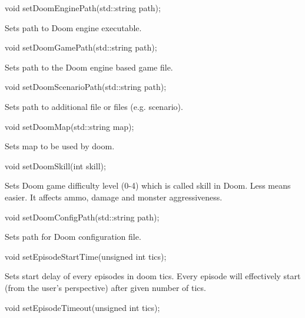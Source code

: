 \vspace{20pt}
\begin{clinee}
void setDoomEnginePath(std::string path);
\end{clinee}

Sets path to Doom engine executable.


\vspace{20pt}
\begin{clinee}
void setDoomGamePath(std::string path);
\end{clinee}

Sets path to the Doom engine based game file.


\vspace{20pt}
\begin{clinee}
void setDoomScenarioPath(std::string path);
\end{clinee}

Sets path to additional file or files (e.g. scenario).


\vspace{20pt}
\begin{clinee}
void setDoomMap(std::string map);
\end{clinee}

Sets map to be used by doom.


\vspace{20pt}
\begin{clinee}      
void setDoomSkill(int skill);
\end{clinee}

Sets Doom game difficulty level (0-4) which is called skill in Doom. Less means easier. It affects ammo, damage and monster aggressiveness.


\vspace{20pt}
\begin{clinee}
void setDoomConfigPath(std::string path);
\end{clinee}

Sets path for Doom configuration file.


\vspace{20pt}
\begin{clinee}    
void setEpisodeStartTime(unsigned int tics);
\end{clinee}

Sets start delay of every episodes in doom tics. Every episode will effectively start (from the user's perspective) after given number of tics.


\vspace{20pt}
\begin{clinee}
void setEpisodeTimeout(unsigned int tics);
\end{clinee}

